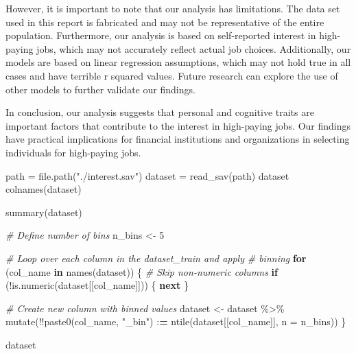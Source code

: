 \documentclass[
]{article}
\newenvironment{Shaded}{\begin{snugshade}}{\end{snugshade}}
\newcommand{\AttributeTok}[1]{\textcolor[rgb]{0.77,0.63,0.00}{#1}}
\newcommand{\CommentTok}[1]{\textcolor[rgb]{0.56,0.35,0.01}{\textit{#1}}}
\newcommand{\ControlFlowTok}[1]{\textcolor[rgb]{0.13,0.29,0.53}{\textbf{#1}}}
\newcommand{\DecValTok}[1]{\textcolor[rgb]{0.00,0.00,0.81}{#1}}
\newcommand{\ErrorTok}[1]{\textcolor[rgb]{0.64,0.00,0.00}{\textbf{#1}}}
\newcommand{\FunctionTok}[1]{\textcolor[rgb]{0.00,0.00,0.00}{#1}}
\newcommand{\NormalTok}[1]{#1}
\newcommand{\OtherTok}[1]{\textcolor[rgb]{0.56,0.35,0.01}{#1}}
\newcommand{\SpecialCharTok}[1]{\textcolor[rgb]{0.00,0.00,0.00}{#1}}
\newcommand{\StringTok}[1]{\textcolor[rgb]{0.31,0.60,0.02}{#1}}
\begin{document}
However, it is important to note that our analysis has limitations. The
data set used in this report is fabricated and may not be representative
of the entire population. Furthermore, our analysis is based on
self-reported interest in high-paying jobs, which may not accurately
reflect actual job choices. Additionally, our models are based on linear
regression assumptions, which may not hold true in all cases and have
terrible r squared values. Future research can explore the use of other
models to further validate our findings.

In conclusion, our analysis suggests that personal and cognitive traits
are important factors that contribute to the interest in high-paying
jobs. Our findings have practical implications for financial
institutions and organizations in selecting individuals for high-paying
jobs.

\begin{Shaded}
\begin{Highlighting}[]
\NormalTok{path }\OtherTok{=} \FunctionTok{file.path}\NormalTok{(}\StringTok{"./interest.sav"}\NormalTok{)}
\NormalTok{dataset }\OtherTok{=} \FunctionTok{read\_sav}\NormalTok{(path)}
\NormalTok{dataset}
\FunctionTok{colnames}\NormalTok{(dataset)}
\end{Highlighting}
\end{Shaded}

\begin{Shaded}
\begin{Highlighting}[]
\FunctionTok{summary}\NormalTok{(dataset)}
\end{Highlighting}
\end{Shaded}

\begin{Shaded}
\begin{Highlighting}[]
\CommentTok{\# Define number of bins}
\NormalTok{n\_bins }\OtherTok{\textless{}{-}} \DecValTok{5}

\CommentTok{\# Loop over each column in the dataset\_train and apply}
\CommentTok{\# binning}
\ControlFlowTok{for}\NormalTok{ (col\_name }\ControlFlowTok{in} \FunctionTok{names}\NormalTok{(dataset)) \{}
    \CommentTok{\# Skip non{-}numeric columns}
    \ControlFlowTok{if}\NormalTok{ (}\SpecialCharTok{!}\FunctionTok{is.numeric}\NormalTok{(dataset[[col\_name]])) \{}
        \ControlFlowTok{next}
\NormalTok{    \}}

    \CommentTok{\# Create new column with binned values}
\NormalTok{    dataset }\OtherTok{\textless{}{-}}\NormalTok{ dataset }\SpecialCharTok{\%\textgreater{}\%}
        \FunctionTok{mutate}\NormalTok{(}\SpecialCharTok{!!}\FunctionTok{paste0}\NormalTok{(col\_name, }\StringTok{"\_bin"}\NormalTok{) }\SpecialCharTok{:}\ErrorTok{=} \FunctionTok{ntile}\NormalTok{(dataset[[col\_name]],}
            \AttributeTok{n =}\NormalTok{ n\_bins))}
\NormalTok{\}}

\NormalTok{dataset}
\end{Highlighting}
\end{Shaded}
\end{document}
